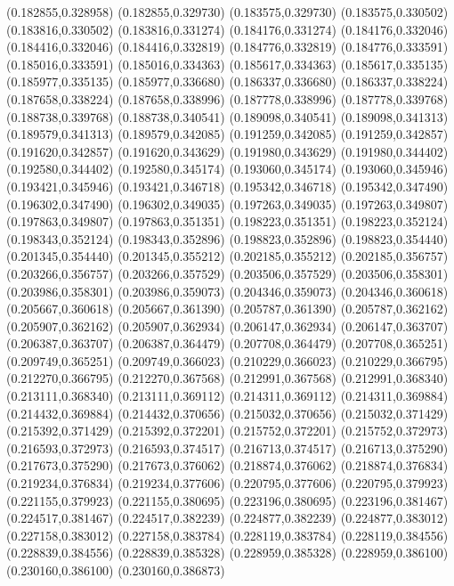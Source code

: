 (0.182855,0.328958)
(0.182855,0.329730)
(0.183575,0.329730)
(0.183575,0.330502)
(0.183816,0.330502)
(0.183816,0.331274)
(0.184176,0.331274)
(0.184176,0.332046)
(0.184416,0.332046)
(0.184416,0.332819)
(0.184776,0.332819)
(0.184776,0.333591)
(0.185016,0.333591)
(0.185016,0.334363)
(0.185617,0.334363)
(0.185617,0.335135)
(0.185977,0.335135)
(0.185977,0.336680)
(0.186337,0.336680)
(0.186337,0.338224)
(0.187658,0.338224)
(0.187658,0.338996)
(0.187778,0.338996)
(0.187778,0.339768)
(0.188738,0.339768)
(0.188738,0.340541)
(0.189098,0.340541)
(0.189098,0.341313)
(0.189579,0.341313)
(0.189579,0.342085)
(0.191259,0.342085)
(0.191259,0.342857)
(0.191620,0.342857)
(0.191620,0.343629)
(0.191980,0.343629)
(0.191980,0.344402)
(0.192580,0.344402)
(0.192580,0.345174)
(0.193060,0.345174)
(0.193060,0.345946)
(0.193421,0.345946)
(0.193421,0.346718)
(0.195342,0.346718)
(0.195342,0.347490)
(0.196302,0.347490)
(0.196302,0.349035)
(0.197263,0.349035)
(0.197263,0.349807)
(0.197863,0.349807)
(0.197863,0.351351)
(0.198223,0.351351)
(0.198223,0.352124)
(0.198343,0.352124)
(0.198343,0.352896)
(0.198823,0.352896)
(0.198823,0.354440)
(0.201345,0.354440)
(0.201345,0.355212)
(0.202185,0.355212)
(0.202185,0.356757)
(0.203266,0.356757)
(0.203266,0.357529)
(0.203506,0.357529)
(0.203506,0.358301)
(0.203986,0.358301)
(0.203986,0.359073)
(0.204346,0.359073)
(0.204346,0.360618)
(0.205667,0.360618)
(0.205667,0.361390)
(0.205787,0.361390)
(0.205787,0.362162)
(0.205907,0.362162)
(0.205907,0.362934)
(0.206147,0.362934)
(0.206147,0.363707)
(0.206387,0.363707)
(0.206387,0.364479)
(0.207708,0.364479)
(0.207708,0.365251)
(0.209749,0.365251)
(0.209749,0.366023)
(0.210229,0.366023)
(0.210229,0.366795)
(0.212270,0.366795)
(0.212270,0.367568)
(0.212991,0.367568)
(0.212991,0.368340)
(0.213111,0.368340)
(0.213111,0.369112)
(0.214311,0.369112)
(0.214311,0.369884)
(0.214432,0.369884)
(0.214432,0.370656)
(0.215032,0.370656)
(0.215032,0.371429)
(0.215392,0.371429)
(0.215392,0.372201)
(0.215752,0.372201)
(0.215752,0.372973)
(0.216593,0.372973)
(0.216593,0.374517)
(0.216713,0.374517)
(0.216713,0.375290)
(0.217673,0.375290)
(0.217673,0.376062)
(0.218874,0.376062)
(0.218874,0.376834)
(0.219234,0.376834)
(0.219234,0.377606)
(0.220795,0.377606)
(0.220795,0.379923)
(0.221155,0.379923)
(0.221155,0.380695)
(0.223196,0.380695)
(0.223196,0.381467)
(0.224517,0.381467)
(0.224517,0.382239)
(0.224877,0.382239)
(0.224877,0.383012)
(0.227158,0.383012)
(0.227158,0.383784)
(0.228119,0.383784)
(0.228119,0.384556)
(0.228839,0.384556)
(0.228839,0.385328)
(0.228959,0.385328)
(0.228959,0.386100)
(0.230160,0.386100)
(0.230160,0.386873)
